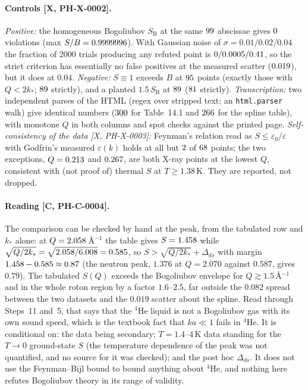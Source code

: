 \documentclass[11pt]{article}
\theoremstyle{remark}
\newcommand{\tier}[1]{\textsf{[#1]}}
\newcommand{\ks}{k_*}
\newcommand{\eps}{\varepsilon}
\newcommand{\SB}{S_{\mathrm B}}
\begin{document}
\paragraph{Controls \tier{X, PH-X-0002}.} \emph{Positive:} the homogeneous Bogoliubov $\SB$ at the same $99$ abscissae gives $0$ violations (max $S/B=0.9999996$). With Gaussian noise of $\sigma=0.01/0.02/0.04$ the fraction of 2000 trials producing any refuted point is $0/0.0005/0.41$, so the strict criterion has
essentially no false positives at the measured scatter ($0.019$), but it does at $0.04$. \emph{Negative:} $S\equiv1$ exceeds $B$ at $95$ points (exactly those with $Q<2\ks$; $89$ strictly), and a planted $1.5\,\SB$ at $89$ ($81$ strictly).
\emph{Transcription:} two independent parses of the HTML (regex over stripped text; an \texttt{html.parser} walk) give identical numbers ($300$ for Table~14.1 and $266$ for the spline table), with monotone $Q$ in both columns and spot checks against the printed page.
\emph{Self-consistency of the data \tier{X, PH-X-0003}:} Feynman's relation read as $S\le\eps_0/\eps$ with Godfrin's measured $\eps(k)$ holds at all but $2$ of $68$ points; the two exceptions, $Q=0.213$ and $0.267$, are both X-ray points at the lowest $Q$, consistent with (not proof of) thermal $S$ at $T\ge1.38$\,K. They are reported, not dropped.

\paragraph{Reading \tier{C, PH-C-0004}.} The comparison can be checked by hand at the peak, from the tabulated row and $\ks$ alone: at $Q=2.058$\,\AA$^{-1}$ the table gives $S=1.458$ while $\sqrt{Q/2\ks}=\sqrt{\PHPeakQ/\PHTwoKstar}=\PHPeakBound$, so $S>\sqrt{Q/2\ks}+\Delta_{ds}$ with margin $1.458-0.585\approx0.87$ (the neutron peak, $1.376$ at $Q=2.070$ against $0.587$, gives $0.79$). The tabulated $S(Q)$ exceeds the Bogoliubov envelope for $Q\gtrsim1.5$\,\AA$^{-1}$ and in the whole roton region by a factor $1.6$--$2.5$, far outside the $0.082$ spread between the two datasets and the $0.019$ scatter about the spline. Read through Steps~11 and~5, that says that the $^4$He liquid is not a Bogoliubov gas
with its own sound speed, which is the textbook fact that $k a\ll1$ fails in $^4$He. It is conditional on: the data being secondary; $T=1.4$--$4$\,K data standing for the $T\to0$ ground-state $S$ (the temperature dependence of the peak was not quantified, and no source for it was checked); and the post hoc $\Delta_{ds}$.
It does not use the Feynman--Bijl bound to bound anything about $^4$He, and nothing here refutes Bogoliubov theory in its range of validity.
\end{document}

